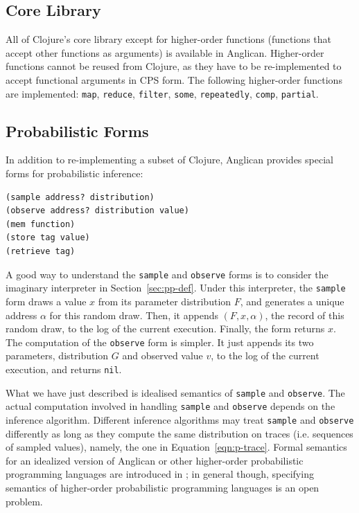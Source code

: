 \documentclass[preprint]{sigplanconf}
\begin{document}
\subsection{Core Library}
\label{sec:core}

All of Clojure's core library except for higher-order functions
(functions that accept other functions as arguments) is
available in Anglican. Higher-order functions cannot be reused
from Clojure, as they have to be re-implemented to accept
functional arguments in CPS form. The following higher-order
functions are implemented: \texttt{map}, \texttt{reduce},
\texttt{filter}, \texttt{some}, \texttt{repeatedly},
\texttt{comp}, \texttt{partial}.

\subsection{Probabilistic Forms}

In addition to re-implementing a subset of Clojure, Anglican
provides special forms for probabilistic inference:
\begin{lstlisting}[style=default]
(sample address? distribution)
(observe address? distribution value)
(mem function)
(store tag value)
(retrieve tag)
\end{lstlisting}

A good way to understand the \texttt{sample} and \texttt{observe} forms
is to consider the imaginary interpreter in Section~\ref{sec:pp-def}.
Under this interpreter, the \texttt{sample} form draws a value $x$ from 
its parameter distribution $F$, and 
generates a unique address $\alpha$ for this random draw.
Then, it appends $(F, x, \alpha)$, the record of this random
draw, to the log of the current execution. Finally, the
form returns $x$. The computation of the \texttt{observe} form is
simpler. It just appends its two parameters, distribution $G$
and observed value $v$, to the log of the current execution,
and returns \texttt{nil}.

What we have just described is idealised semantics 
of \texttt{sample} and \texttt{observe}. The actual computation 
involved in handling \texttt{sample} and \texttt{observe} 
depends on the inference algorithm. Different inference algorithms may treat
\texttt{sample} and \texttt{observe} differently as long as they
compute the same distribution on traces (i.e. sequences of sampled values), 
namely, the one in Equation~\ref{eqn:p-trace}.
Formal semantics for an idealized version
of Anglican or other higher-order probabilistic programming languages are introduced 
in \cite{SYH+16,BorgstromLGS16}; in general though,
specifying semantics of higher-order probabilistic programming
languages is an open problem.
\end{document}
